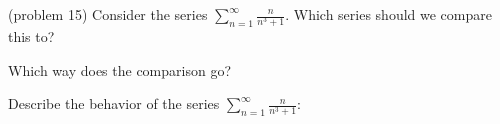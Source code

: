 \documentclass{ximera}
\begin{document}
\begin{problem}(problem 15)
Consider the series $\displaystyle{\sum_{n=1}^\infty \frac{n}{n^3 + 1}}$.
Which series should we compare this to?

\begin{multipleChoice}
\end{multipleChoice}

Which way does the comparison go?
\begin{multipleChoice}
\end{multipleChoice}

Describe the behavior of the series $\sum_{n=1}^\infty \frac{n}{n^3 + 1}:$
\begin{multipleChoice}
\end{multipleChoice}

\end{problem}
\end{document}
